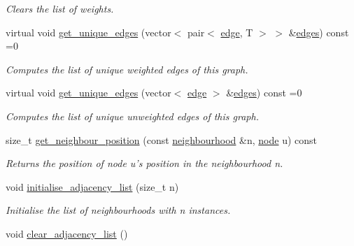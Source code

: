 \begin{DoxyCompactItemize}
\begin{DoxyCompactList}\small\item\em Clears the list of weights. \end{DoxyCompactList}\item 
virtual void \hyperlink{classlgraph_1_1utils_1_1wxgraph_a2cf8037faaa1a2fd081e3d58e55a1932}{get\-\_\-unique\-\_\-edges} (vector$<$ pair$<$ \hyperlink{namespacelgraph_1_1utils_a6510284ce1b1ae5dc97ce5d2de426e10}{edge}, T $>$ $>$ \&\hyperlink{classlgraph_1_1utils_1_1wxgraph_a73b6c8887d5088750ee2cc98c45089c6}{edges}) const =0
\begin{DoxyCompactList}\small\item\em Computes the list of unique weighted edges of this graph. \end{DoxyCompactList}\item 
virtual void \hyperlink{classlgraph_1_1utils_1_1wxgraph_aaafce72400fb01e86b6c9f85a17406d0}{get\-\_\-unique\-\_\-edges} (vector$<$ \hyperlink{namespacelgraph_1_1utils_a6510284ce1b1ae5dc97ce5d2de426e10}{edge} $>$ \&\hyperlink{classlgraph_1_1utils_1_1wxgraph_a73b6c8887d5088750ee2cc98c45089c6}{edges}) const =0
\begin{DoxyCompactList}\small\item\em Computes the list of unique unweighted edges of this graph. \end{DoxyCompactList}\item 
size\-\_\-t \hyperlink{classlgraph_1_1utils_1_1xxgraph_aac7ef2134cad9529869f1334de7892d9}{get\-\_\-neighbour\-\_\-position} (const \hyperlink{namespacelgraph_1_1utils_a0f2ef47028a466d26841709e705390ac}{neighbourhood} \&n, \hyperlink{namespacelgraph_1_1utils_a7bd66ede3805ef121bc2835bd48de0cf}{node} u) const 
\begin{DoxyCompactList}\small\item\em Returns the position of node {\itshape u's} position in the neighbourhood {\itshape n}. \end{DoxyCompactList}\item 
\hypertarget{classlgraph_1_1utils_1_1xxgraph_a2201aaff5e9ffa29a9b3abfde705dd46}{void \hyperlink{classlgraph_1_1utils_1_1xxgraph_a2201aaff5e9ffa29a9b3abfde705dd46}{initialise\-\_\-adjacency\-\_\-list} (size\-\_\-t n)}\label{classlgraph_1_1utils_1_1xxgraph_a2201aaff5e9ffa29a9b3abfde705dd46}

\begin{DoxyCompactList}\small\item\em Initialise the list of neighbourhoods with {\itshape n} instances. \end{DoxyCompactList}\item 
\hypertarget{classlgraph_1_1utils_1_1xxgraph_a6523402d0ec66918b95de23d2bee38fc}{void \hyperlink{classlgraph_1_1utils_1_1xxgraph_a6523402d0ec66918b95de23d2bee38fc}{clear\-\_\-adjacency\-\_\-list} ()}\label{classlgraph_1_1utils_1_1xxgraph_a6523402d0ec66918b95de23d2bee38fc}


\end{DoxyCompactItemize}
